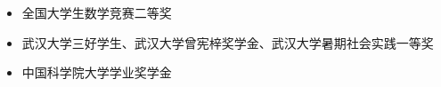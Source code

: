 \documentclass[zh]{resume}
\begin{document}
\begin{itemize}
  \item 全国大学生数学竞赛二等奖
  \item 武汉大学三好学生、武汉大学曾宪梓奖学金、武汉大学暑期社会实践一等奖
  \item 中国科学院大学学业奖学金
\end{itemize}


\end{document}

